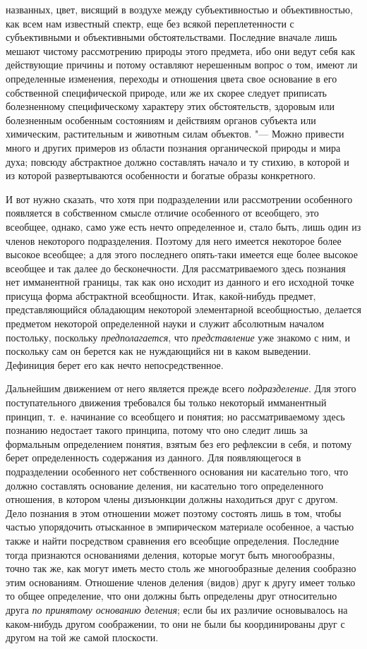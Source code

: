 названных, цвет, висящий в воздухе между субъективностью и объективностью,
как всем нам известный спектр, еще без всякой переплетенности с
субъективными и объективными обстоятельствами. Последние вначале лишь
мешают чистому рассмотрению природы этого предмета, ибо они ведут себя как
действующие причины и потому оставляют нерешенным вопрос о том, имеют ли
определенные изменения, переходы и отношения цвета свое основание в его
собственной специфической природе, или же их скорее следует приписать
болезненному специфическому характеру этих обстоятельств, здоровым или
болезненным особенным состояниям и действиям органов субъекта или
химическим, растительным и животным силам объектов. "--- Можно
привести много и других примеров из области познания органической природы и
мира духа; повсюду абстрактное должно составлять начало и ту стихию, в
которой и из которой развертываются особенности и богатые образы
конкретного.

И вот нужно сказать, что хотя при подразделении или
рассмотрении особенного появляется в собственном смысле отличие особенного
от всеобщего, это всеобщее, однако, само уже есть нечто определенное и,
стало быть, лишь один из членов некоторого подразделения. Поэтому для него
имеется некоторое более высокое всеобщее; а для этого последнего опять-таки
имеется еще более высокое всеобщее и так далее до
бесконечности. Для рассматриваемого здесь познания нет имманентной границы,
так как оно исходит из данного и его исходной точке присуща форма
абстрактной всеобщности. Итак, какой-нибудь предмет, представляющийся
обладающим некоторой элементарной всеобщностью, делается предметом
некоторой определенной науки и служит абсолютным началом постольку,
поскольку {\em предполагается},
что {\em представление}
уже знакомо с ним, и поскольку сам он берется как не
нуждающийся ни в каком выведении. Дефиниция берет его как нечто
непосредственное.

Дальнейшим движением от него является прежде всего
{\em подразделение}. Для
этого поступательного движения требовался бы только некоторый имманентный
принцип, т.~е. начинание со всеобщего и понятия; но рассматриваемому здесь
познанию недостает такого принципа, потому что оно следит лишь за
формальным определением понятия, взятым без его рефлексии в себя, и потому
берет определенность содержания из данного. Для появляющегося в
подразделении особенного нет собственного основания ни касательно того, что
должно составлять основание деления, ни касательно того определенного
отношения, в котором члены дизъюнкции должны находиться друг с другом. Дело
познания в этом отношении может поэтому состоять лишь в том, чтобы частью
упорядочить отысканное в эмпирическом материале особенное, а частью также и
найти посредством сравнения его всеобщие определения. Последние тогда
признаются основаниями деления, которые могут быть многообразны, точно так
же, как могут иметь место столь же многообразные деления сообразно этим
основаниям. Отношение членов деления (видов) друг к другу имеет только то
общее определение, что они должны быть определены друг относительно друга
{\em по принятому основанию деления};
если бы их различие основывалось на каком-нибудь другом
соображении, то они не были бы координированы друг с другом на той же самой
плоскости.

